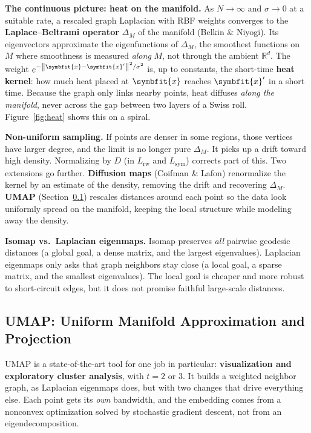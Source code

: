 \documentclass[11pt]{article}
\newcommand{\bm}[1]{\symbfit{#1}}
\newcommand{\R}{\mathbb{R}}
\newcommand{\vx}{\bm{x}}
\newcommand{\norm}[1]{\left\lVert #1\right\rVert}
\begin{document}
\begin{deeper}
\textbf{The continuous picture: heat on the manifold.} As $N\to\infty$ and $\sigma\to0$ at a suitable rate, a rescaled graph Laplacian with RBF weights
converges to the \textbf{Laplace--Beltrami operator} $\Delta_M$ of the manifold (Belkin \& Niyogi). Its eigenvectors approximate the eigenfunctions of
$\Delta_M$, the smoothest functions on $M$ where smoothness is measured \emph{along} $M$, not through the ambient $\R^d$. The weight
$e^{-\norm{\vx-\vx'}^2/\sigma^2}$ is, up to constants, the short-time \textbf{heat kernel}: how much heat placed at $\vx$ reaches $\vx'$ in a short time.
Because the graph only links nearby points, heat diffuses \emph{along the manifold}, never across the gap between two layers of a Swiss roll. Figure~\ref{fig:heat} shows this on a spiral.

\textbf{Non-uniform sampling.} If points are denser in some regions, those vertices have larger degree, and the limit is no longer pure $\Delta_M$.
It picks up a drift toward high density. Normalizing by $D$ (in $L_{\mathrm{rw}}$ and $L_{\mathrm{sym}}$) corrects part of this. Two extensions go further.
\textbf{Diffusion maps} (Coifman \& Lafon) renormalize the kernel by an estimate of the density, removing the drift and recovering $\Delta_M$.
\textbf{UMAP} (Section~\ref{sec:umap}) rescales distances around each point so the data look uniformly spread on the manifold, keeping the local
structure while modeling away the density.

\textbf{Isomap vs.\ Laplacian eigenmaps.} Isomap preserves \emph{all} pairwise geodesic distances (a global goal, a dense matrix, and the largest
eigenvalues). Laplacian eigenmaps only asks that graph neighbors stay close (a local goal, a sparse matrix, and the smallest eigenvalues). The local
goal is cheaper and more robust to short-circuit edges, but it does not promise faithful large-scale distances.
\end{deeper}

\subsection{UMAP: Uniform Manifold Approximation and Projection}\label{sec:umap}

UMAP is a state-of-the-art tool for one job in particular: \textbf{visualization and exploratory cluster analysis}, with $t=2$ or $3$.
It builds a weighted neighbor graph, as Laplacian eigenmaps does, but with two changes that drive everything else. Each point gets its \emph{own} bandwidth, and
the embedding comes from a nonconvex optimization solved by stochastic gradient descent, not from an eigendecomposition.
\end{document}
